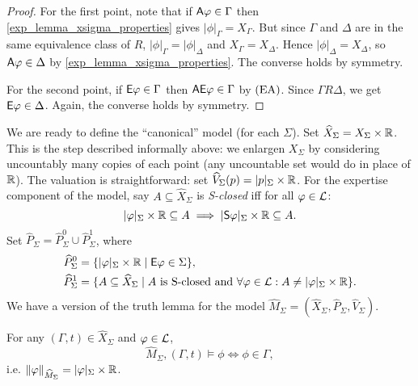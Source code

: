 \begin{proof}
    For the first point, note that if $\mathsf{A}\varphi \in \Gamma$ then
    \cref{exp_lemma_xsigma_properties} gives $|\phi|_\Gamma = X_\Gamma$. But since
    $\Gamma$ and $\Delta$ are in the same equivalence class of $R$,
    $|\phi|_\Gamma = |\phi|_\Delta$ and $X_\Gamma = X_\Delta$.  Hence
    $|\phi|_\Delta = X_\Delta$, so $\mathsf{A}\varphi \in \Delta$ by
    \cref{exp_lemma_xsigma_properties}. The converse holds by symmetry.

    For the second point, if $\mathsf{E}\varphi \in \Gamma$ then $\mathsf{A}\mathsf{E}\varphi \in \Gamma$ by
    $(\text{EA})$. Since $\Gamma R \Delta$, we get $\mathsf{E}\varphi \in \Delta$. Again, the
    converse holds by symmetry.
\end{proof}

We are ready to define the ``canonical'' model (for each $\Sigma$). Set
$\widehat{X}_\Sigma = X_\Sigma \times \mathbb{R}$. This is the step described
informally above: we enlargen $X_\Sigma$ by considering uncountably many copies
of each point (any uncountable set would do in place of $\mathbb{R}$). The valuation is
straightforward: set $\widehat{V}_\Sigma(p) = |p|_\Sigma \times \mathbb{R}$. For the
expertise component of the model, say $A \subseteq \widehat{X}_\Sigma$ is
\emph{S-closed} iff for all $\varphi \in \mathcal{L}$:
\[
    |\varphi|_\Sigma \times \mathbb{R} \subseteq A
    \implies |\mathsf{S}\varphi|_\Sigma \times \mathbb{R} \subseteq A.
\]
Set $\widehat{P}_\Sigma = \widehat{P}_\Sigma^0 \cup \widehat{P}_\Sigma^1$,
where
\[
\begin{aligned}
 \widehat{P}_\Sigma^0 &= \{|\varphi|_\Sigma \times \mathbb{R} \mid \mathsf{E}\varphi \in \Sigma\}, \\
 \widehat{P}_\Sigma^1 &= \{
     A \subseteq \widehat{X}_\Sigma
     \mid
     A \text{ is S-closed and }
     \forall \varphi \in \mathcal{L}: A \ne |\varphi|_\Sigma \times \mathbb{R}
 \}.
\end{aligned}
\]
We have a version of the truth lemma for the model $\widehat{M}_\Sigma =
(\widehat{X}_\Sigma, \widehat{P}_\Sigma, \widehat{V}_\Sigma)$.

\begin{lemma}
\label{exp_lemma_truth_lemma}
    For any $(\Gamma, t) \in \widehat{X}_\Sigma$ and $\varphi \in \mathcal{L}$,
    \[
        \widehat{M}_\Sigma, (\Gamma, t) \models \phi
        \iff
        \phi \in \Gamma,
    \]
    i.e. $\|\varphi\|_{\widehat{M}_\Sigma} = |\varphi|_\Sigma \times \mathbb{R}$.
\end{lemma}

